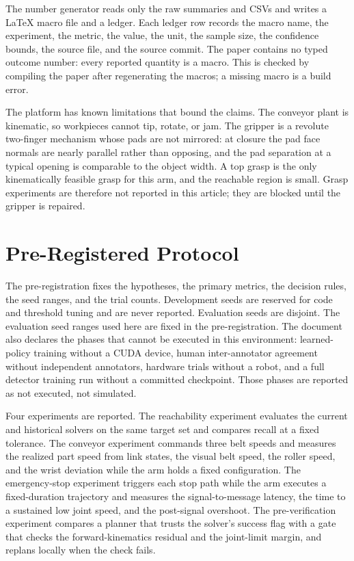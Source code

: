 \documentclass[journal]{IEEEtran}
\begin{document}
The number generator reads only the raw summaries and CSVs and writes a LaTeX macro file and a ledger. Each ledger row records the macro name, the experiment, the metric, the value, the unit, the sample size, the confidence bounds, the source file, and the source commit. The paper contains no typed outcome number: every reported quantity is a macro. This is checked by compiling the paper after regenerating the macros; a missing macro is a build error.

The platform has known limitations that bound the claims. The conveyor plant is kinematic, so workpieces cannot tip, rotate, or jam. The gripper is a revolute two-finger mechanism whose pads are not mirrored: at closure the pad face normals are nearly parallel rather than opposing, and the pad separation at a typical opening is comparable to the object width. A top grasp is the only kinematically feasible grasp for this arm, and the reachable region is small. Grasp experiments are therefore not reported in this article; they are blocked until the gripper is repaired.

\section{Pre-Registered Protocol}
\label{sec:protocol}
The pre-registration fixes the hypotheses, the primary metrics, the decision rules, the seed ranges, and the trial counts. Development seeds are reserved for code and threshold tuning and are never reported. Evaluation seeds are disjoint. The evaluation seed ranges used here are fixed in the pre-registration. The document also declares the phases that cannot be executed in this environment: learned-policy training without a CUDA device, human inter-annotator agreement without independent annotators, hardware trials without a robot, and a full detector training run without a committed checkpoint. Those phases are reported as not executed, not simulated.

Four experiments are reported. The reachability experiment evaluates the current and historical solvers on the same target set and compares recall at a fixed tolerance. The conveyor experiment commands three belt speeds and measures the realized part speed from link states, the visual belt speed, the roller speed, and the wrist deviation while the arm holds a fixed configuration. The emergency-stop experiment triggers each stop path while the arm executes a fixed-duration trajectory and measures the signal-to-message latency, the time to a sustained low joint speed, and the post-signal overshoot. The pre-verification experiment compares a planner that trusts the solver's success flag with a gate that checks the forward-kinematics residual and the joint-limit margin, and replans locally when the check fails.
\end{document}
